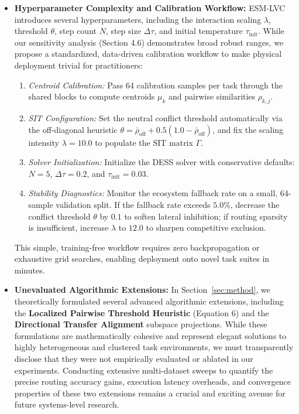 \begin{itemize}
    \item \textbf{Hyperparameter Complexity and Calibration Workflow:} ESM-LVC introduces several hyperparameters, including the interaction scaling $\lambda$, threshold $\theta$, step count $N$, step size $\Delta \tau$, and initial temperature $\tau_{\text{init}}$. While our sensitivity analysis (Section 4.6) demonstrates broad robust ranges, we propose a standardized, data-driven calibration workflow to make physical deployment trivial for practitioners:
    \begin{enumerate}
        \item \emph{Centroid Calibration:} Pass 64 calibration samples per task through the shared blocks to compute centroids $\mu_k$ and pairwise similarities $\rho_{k, j}$.
        \item \emph{SIT Configuration:} Set the neutral conflict threshold automatically via the off-diagonal heuristic $\theta = \bar{\rho}_{\text{off}} + 0.5(1.0 - \bar{\rho}_{\text{off}})$, and fix the scaling intensity $\lambda = 10.0$ to populate the SIT matrix $\Gamma$.
        \item \emph{Solver Initialization:} Initialize the DESS solver with conservative defaults: $N=5$, $\Delta\tau = 0.2$, and $\tau_{\text{init}} = 0.03$.
        \item \emph{Stability Diagnostics:} Monitor the ecosystem fallback rate on a small, 64-sample validation split. If the fallback rate exceeds $5.0\%$, decrease the conflict threshold $\theta$ by $0.1$ to soften lateral inhibition; if routing sparsity is insufficient, increase $\lambda$ to $12.0$ to sharpen competitive exclusion.
    \end{enumerate}
    This simple, training-free workflow requires zero backpropagation or exhaustive grid searches, enabling deployment onto novel task suites in minutes.

    \item \textbf{Unevaluated Algorithmic Extensions:} In Section~\ref{sec:method}, we theoretically formulated several advanced algorithmic extensions, including the \textbf{Localized Pairwise Threshold Heuristic} (Equation 6) and the \textbf{Directional Transfer Alignment} subspace projections. While these formulations are mathematically cohesive and represent elegant solutions to highly heterogeneous and clustered task environments, we must transparently disclose that they were not empirically evaluated or ablated in our experiments. Conducting extensive multi-dataset sweeps to quantify the precise routing accuracy gains, execution latency overheads, and convergence properties of these two extensions remains a crucial and exciting avenue for future systems-level research.


\end{itemize}
